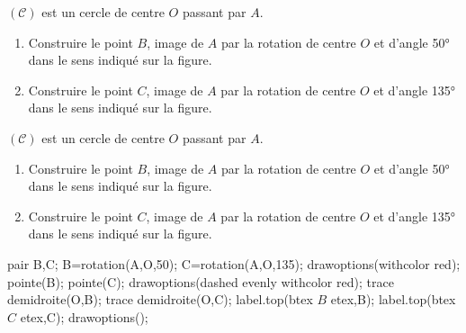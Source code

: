 \begin{exercice*}
    $(\mathcal{C})$ est un cercle de centre $O$ passant par $A$.
    \begin{enumerate}
        \item Construire le point $B$, image de $A$ par la rotation de centre $O$ et d'angle \ang{50} dans le sens indiqué sur la figure.
        \item Construire le point $C$, image de $A$ par la rotation de centre $O$ et d'angle \ang{135} dans le sens indiqué sur la figure.
    \end{enumerate}
    \begin{center}
        \begin{Geometrie}[CoinHD={(7u,6u)}]
            \enonceTroisiemeGTroisExoNeuf
        \end{Geometrie}
    \end{center}
\end{exercice*}
\begin{corrige}
    $(\mathcal{C})$ est un cercle de centre $O$ passant par $A$.

    \begin{enumerate}
        \item Construire le point $B$, image de $A$ par la rotation de centre $O$ et d'angle \ang{50} dans le sens indiqué sur la figure.
        \item Construire le point $C$, image de $A$ par la rotation de centre $O$ et d'angle \ang{135} dans le sens indiqué sur la figure.
    \end{enumerate}
    \begin{center}
        \begin{Geometrie}[CoinHD={(7u,6u)}]
            \enonceTroisiemeGTroisExoNeuf
            pair B,C;
            B=rotation(A,O,50);        
            C=rotation(A,O,135);
            drawoptions(withcolor red);
            pointe(B);
            pointe(C);
            drawoptions(dashed evenly withcolor red);
            trace demidroite(O,B);
            trace demidroite(O,C);
            label.top(btex $B$ etex,B);
            label.top(btex $C$ etex,C);
            drawoptions();
        \end{Geometrie}
    \end{center}
\end{corrige}

